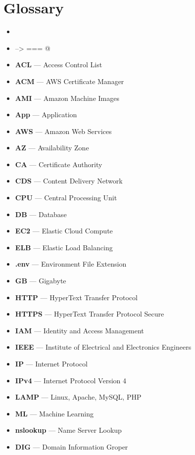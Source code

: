 \chapter{Glossary}\label{ch:glossary}

\begin{itemize}
    \item
    \item --> === @
    \item  \textbf{ACL} \tab— Access Control List
    \item  \textbf{ACM} \tab— AWS Certificate Manager
    \item  \textbf{AMI} \tab— Amazon Machine Images
    \item  \textbf{App} \tab— Application
    \item  \textbf{AWS} \tab— Amazon Web Services
    \item  \textbf{AZ} \tab— Availability Zone
    \item  \textbf{CA} \tab— Certificate Authority
    \item  \textbf{CDS} \tab— Content Delivery Network
    \item  \textbf{CPU} \tab— Central Processing Unit
    \item  \textbf{DB} \tab— Database
    \item  \textbf{EC2} \tab— Elastic Cloud Compute
    \item  \textbf{ELB} \tab— Elastic Load Balancing
    \item  \textbf{.env} \tab— Environment File Extension
    \item  \textbf{GB} \tab— Gigabyte
    \item  \textbf{HTTP} \tab— HyperText Transfer Protocol
    \item  \textbf{HTTPS} \tab— HyperText Transfer Protocol Secure
    \item  \textbf{IAM} \tab— Identity and Access Management
    \item  \textbf{IEEE} \tab— Institute of Electrical and Electronics Engineers
    \item  \textbf{IP} \tab— Internet Protocol
    \item  \textbf{IPv4} \tab— Internet Protocol Version 4
    \item  \textbf{LAMP} \tab— Linux, Apache, MySQL, PHP
    \item  \textbf{ML} \tab— Machine Learning
    \item  \textbf{nslookup} \tab— Name Server Lookup
    \item  \textbf{DIG} \tab— Domain Information Groper

\end{itemize}
